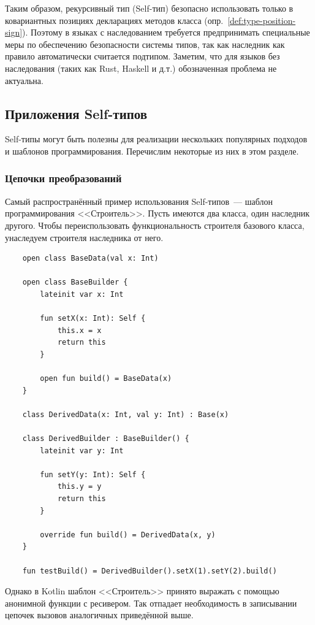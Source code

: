 Таким образом, рекурсивный тип (Self-тип) безопасно использовать только в ковариантных позициях декларациях методов класса (опр.~\ref{def:type-position-sign}).
Поэтому в языках с наследованием требуется предпринимать специальные меры по обеспечению безопасности системы типов, так как наследник как правило автоматически считается подтипом.
Заметим, что для языков без наследования (таких как Rust, Haskell и д.т.) обозначенная проблема не актуальна.


\subsection{Приложения Self-типов}\label{subsec:applications}

Self-типы могут быть полезны для реализации нескольких популярных подходов и шаблонов программирования.
Перечислим некоторые из них в этом разделе.

\subsubsection{Цепочки преобразований}

Самый распространённый пример использования Self-типов~--- шаблон программирования <<Строитель>>.
Пусть имеются два класса, один наследник другого.
Чтобы переиспользовать функциональность строителя базового класса, унаследуем строителя наследника от него.

\begin{verbatim}
    open class BaseData(val x: Int)

    open class BaseBuilder {
        lateinit var x: Int

        fun setX(x: Int): Self {
            this.x = x
            return this
        }

        open fun build() = BaseData(x)
    }

    class DerivedData(x: Int, val y: Int) : Base(x)

    class DerivedBuilder : BaseBuilder() {
        lateinit var y: Int

        fun setY(y: Int): Self {
            this.y = y
            return this
        }

        override fun build() = DerivedData(x, y)
    }

    fun testBuild() = DerivedBuilder().setX(1).setY(2).build()
\end{verbatim}

Однако в Kotlin шаблон <<Строитель>> принято выражать с помощью анонимной функции с ресивером.
Так отпадает необходимость в записывании цепочек вызовов аналогичных приведённой выше.

